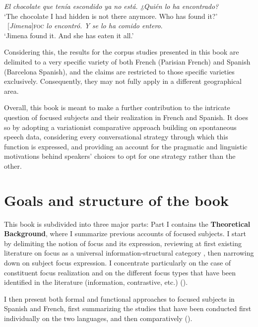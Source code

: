  \ea \label{ex11}
\ea \textit{El chocolate que tenía escondido ya no está. ¿Quién lo ha encontrado?}\\
 ‘The chocolate I had hidden is not there anymore. Who has found it?'
\ex \ {[\textit{Jimena}]\textsc{foc}} \normalsize \textit{lo encontró. Y se lo ha comido entero}.\\
`Jimena found it. And she has eaten it all.' \hfill \parencite[6]{jimenez2015focus}
\z \z 


Considering this, the results for the corpus studies presented in this book are delimited to a very specific variety of both French (Parisian French) and Spanish (Barcelona Spanish), and the claims are restricted to those specific varieties exclusively. Consequently, they may not fully apply in a different geographical area. 

Overall, this book is meant to make a further contribution to the intricate question of focused subjects and their realization in French and Spanish. It does so by adopting a variationist comparative approach building on spontaneous speech data, considering every conversational strategy through which this function is expressed, and providing an account for the pragmatic and linguistic motivations behind speakers' choices to opt for one strategy rather than the other.


\section{Goals and structure of the book} \label{goals}

This book is subdivided into three major parts: Part I contains the \textbf{Theoretical Background}, where I summarize previous accounts of focused subjects. I start by delimiting the notion of focus and its expression, reviewing at first existing literature on focus as a universal information-structural category
\parencite{zimmermann2011focus}, then narrowing down on subject focus expression. I concentrate particularly on the case of constituent focus realization and on the different focus types that have been identified in the literature (information, contrastive, etc.) (\textsc{}).

I then present both formal and functional approaches to focused subjects in Spanish and French, first summarizing the studies that have been conducted first individually on the two languages, and then comparatively (\textsc{}).

